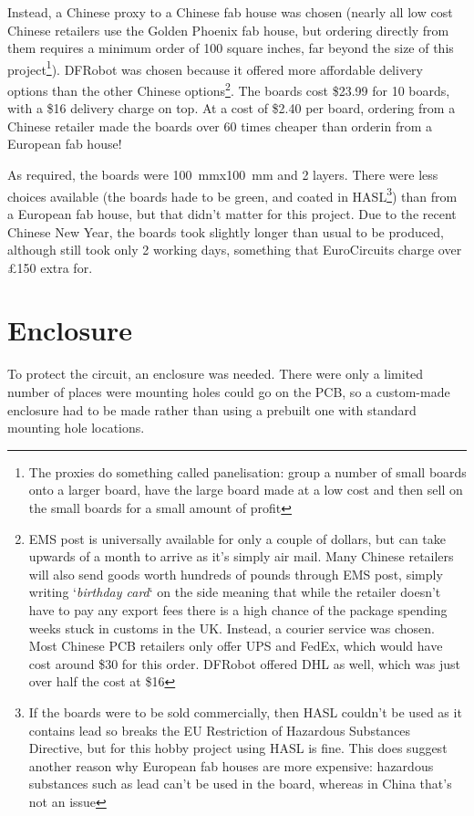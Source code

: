 Instead, a Chinese proxy to a Chinese fab house was chosen (nearly all low cost
Chinese retailers use the Golden Phoenix fab house, but ordering directly from
them requires a minimum order of 100 square inches, far beyond the size of this
project\footnote{The proxies do something called panelisation: group a number of
small boards onto a larger board, have the large board made at a low cost and
then sell on the small boards for a small amount of profit}). DFRobot was chosen
because it offered more affordable delivery options than the other Chinese
options\footnote{EMS post is universally available for only a couple of dollars,
  but can take upwards of a month to arrive as it's simply air mail. Many
  Chinese retailers will also send goods worth hundreds of pounds through EMS
  post, simply writing `\textit{birthday card}` on the side meaning that while
  the retailer doesn't have to pay any export fees there is a high chance of the
  package spending weeks stuck in customs in the UK. Instead, a courier service
was chosen. Most Chinese PCB retailers only offer UPS and FedEx, which would
have cost around \$30 for this order. DFRobot offered DHL as well, which was
just over half the cost at \$16}. The boards cost \$23.99 for 10 boards, with a
\$16 delivery charge on top. At a cost of \$2.40 per board, ordering from a
Chinese retailer made the boards over 60 times cheaper than orderin from a
European fab house!

As required, the boards were \SI{100}{mm}x\SI{100}{mm} and 2 layers. There were
less choices available (the boards hade to be green, and coated in
HASL\footnote{If the boards were to be sold commercially, then HASL couldn't be
  used as it contains lead so breaks the EU Restriction of Hazardous Substances
  Directive, but for this hobby project using HASL is fine. This does suggest
  another reason why European fab houses are more expensive: hazardous
  substances such as lead can't be used in the board, whereas in China that's
not an issue}) than from a European fab house, but that didn't matter for this
project. Due to the recent Chinese New Year, the boards took slightly longer
than usual to be produced, although still took only 2 working days, something
that EuroCircuits charge over \pounds 150 extra for.


\section{Enclosure}

To protect the circuit, an enclosure was needed. There were only a limited
number of places were mounting holes could go on the PCB, so a custom-made
enclosure had to be made rather than using a prebuilt one with standard mounting
hole locations.


